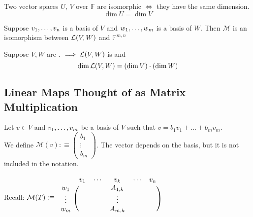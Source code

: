   \begin{thm}
    Two \fd vector spaces $U$, $V$ over $\mathbb{F}$ are isomorphic $\iff$ they have the same dimension. 
    \begin{equation}
      \dim U = \dim V
    \end{equation}
  \end{thm}

  \begin{thm}
    Suppose $v_1, \dots, v_n$ is a basis of $V$ and $w_1, \dots, w_m$ is a basis of $W$. Then $\mathcal{M}$ is an isomorphism between ${\mathcal{L}(V,W)}$ and $\mathbb{F}^{m,n}$
  \end{thm}

  \begin{thm}
    Suppose $V,W$ are \fd. $\implies {\mathcal{L}(V,W)}$ is \fd and
    \begin{equation}
      \dim {\mathcal{L}(V,W)} = (\dim V)\cdot(\dim W)
    \end{equation}
  \end{thm}

  \subsection{Linear Maps Thought of as Matrix Multiplication}

  \begin{mydef}
    Let $v \in V$ and $v_1, \dots, v_m$ be a basis of $V$ such that $v=b_1v_1+\dots+b_mv_m$.
    \\
    We define
    $
    \mathcal{M}(v) :\equiv
    \left (
    \begin{matrix}
      b_1 \\ \vdots \\ b_m
    \end{matrix}
    \right )
    $. The vector depends on the basis, but it is not included in the notation.
  \end{mydef}

  Recall: $
  \mathcal{M} (T) :\equiv
  \begin{blockarray}{cccc}
    & v_1 \quad \cdots & v_k & \cdots \quad v_n \\
    \begin{block}{c(ccc)}
      w_1    & & A_{1,k} & \\
      \vdots & & \vdots & \\
      w_m    & & A_{m,k} & \\
    \end{block}
  \end{blockarray}
  $


